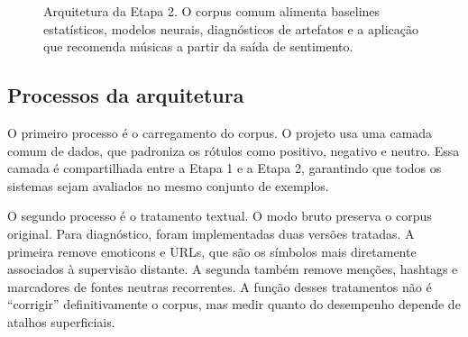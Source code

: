 \documentclass[11pt,a4paper]{article}
\begin{document}
\begin{figure}[h]
\centering
{}
\caption{Arquitetura da Etapa 2. O corpus comum alimenta baselines estatísticos, modelos neurais, diagnósticos de artefatos e a aplicação que recomenda músicas a partir da saída de sentimento.}
\label{fig:pipeline-etapa2}
\end{figure}

\subsection{Processos da arquitetura}

O primeiro processo é o carregamento do corpus. O projeto usa uma camada comum de dados, que padroniza os rótulos como positivo, negativo e neutro. Essa camada é compartilhada entre a Etapa 1 e a Etapa 2, garantindo que todos os sistemas sejam avaliados no mesmo conjunto de exemplos.

O segundo processo é o tratamento textual. O modo bruto preserva o corpus original. Para diagnóstico, foram implementadas duas versões tratadas. A primeira remove emoticons e URLs, que são os símbolos mais diretamente associados à supervisão distante. A segunda também remove menções, hashtags e marcadores de fontes neutras recorrentes. A função desses tratamentos não é ``corrigir'' definitivamente o corpus, mas medir quanto do desempenho depende de atalhos superficiais.
\end{document}
